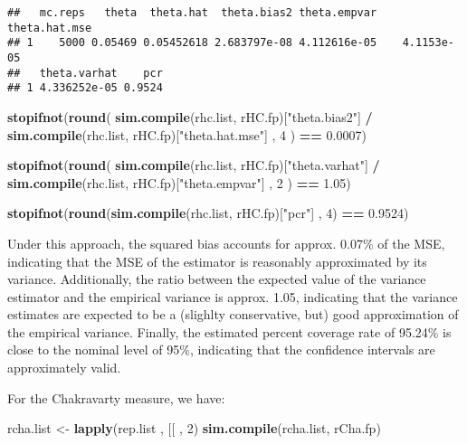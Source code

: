 \documentclass[
]{book}
\newenvironment{Shaded}{\begin{snugshade}}{\end{snugshade}}
\newcommand{\AttributeTok}[1]{\textcolor[rgb]{0.13,0.29,0.53}{#1}}
\newcommand{\DecValTok}[1]{\textcolor[rgb]{0.00,0.00,0.81}{#1}}
\newcommand{\FloatTok}[1]{\textcolor[rgb]{0.00,0.00,0.81}{#1}}
\newcommand{\FunctionTok}[1]{\textcolor[rgb]{0.13,0.29,0.53}{\textbf{#1}}}
\newcommand{\NormalTok}[1]{#1}
\newcommand{\OtherTok}[1]{\textcolor[rgb]{0.56,0.35,0.01}{#1}}
\newcommand{\SpecialCharTok}[1]{\textcolor[rgb]{0.81,0.36,0.00}{\textbf{#1}}}
\newcommand{\StringTok}[1]{\textcolor[rgb]{0.31,0.60,0.02}{#1}}
\begin{document}
\begin{verbatim}
##   mc.reps   theta  theta.hat  theta.bias2 theta.empvar theta.hat.mse
## 1    5000 0.05469 0.05452618 2.683797e-08 4.112616e-05    4.1153e-05
##   theta.varhat    pcr
## 1 4.336252e-05 0.9524
\end{verbatim}

\begin{Shaded}
\begin{Highlighting}[]
\FunctionTok{stopifnot}\NormalTok{(}\FunctionTok{round}\NormalTok{(}
  \FunctionTok{sim.compile}\NormalTok{(rhc.list, rHC.fp)[}\StringTok{"theta.bias2"}\NormalTok{] }\SpecialCharTok{/} \FunctionTok{sim.compile}\NormalTok{(rhc.list, rHC.fp)[}\StringTok{"theta.hat.mse"}\NormalTok{] ,}
  \DecValTok{4}
\NormalTok{) }\SpecialCharTok{==} \FloatTok{0.0007}\NormalTok{)}

\FunctionTok{stopifnot}\NormalTok{(}\FunctionTok{round}\NormalTok{(}
  \FunctionTok{sim.compile}\NormalTok{(rhc.list, rHC.fp)[}\StringTok{"theta.varhat"}\NormalTok{] }\SpecialCharTok{/} \FunctionTok{sim.compile}\NormalTok{(rhc.list, rHC.fp)[}\StringTok{"theta.empvar"}\NormalTok{] ,}
  \DecValTok{2}
\NormalTok{) }\SpecialCharTok{==} \FloatTok{1.05}\NormalTok{)}

\FunctionTok{stopifnot}\NormalTok{(}\FunctionTok{round}\NormalTok{(}\FunctionTok{sim.compile}\NormalTok{(rhc.list, rHC.fp)[}\StringTok{"pcr"}\NormalTok{] , }\DecValTok{4}\NormalTok{) }\SpecialCharTok{==} \FloatTok{0.9524}\NormalTok{)}
\end{Highlighting}
\end{Shaded}

Under this approach, the squared bias accounts for approx. 0.07\% of the MSE, indicating
that the MSE of the estimator is reasonably approximated by its variance. Additionally,
the ratio between the expected value of the variance estimator and the empirical
variance is approx. 1.05, indicating that the variance estimates are expected to
be a (slighlty conservative, but) good approximation of the empirical variance.
Finally, the estimated percent coverage rate of 95.24\% is close to the nominal
level of 95\%, indicating that the confidence intervals are approximately valid.

For the Chakravarty measure, we have:

\begin{Shaded}
\begin{Highlighting}[]
\NormalTok{rcha.list }\OtherTok{\textless{}{-}} \FunctionTok{lapply}\NormalTok{(rep.list , }\StringTok{\textasciigrave{}}\AttributeTok{[[}\StringTok{\textasciigrave{}}\NormalTok{ , }\DecValTok{2}\NormalTok{)}
\FunctionTok{sim.compile}\NormalTok{(rcha.list, rCha.fp)}
\end{Highlighting}
\end{Shaded}
\end{document}
